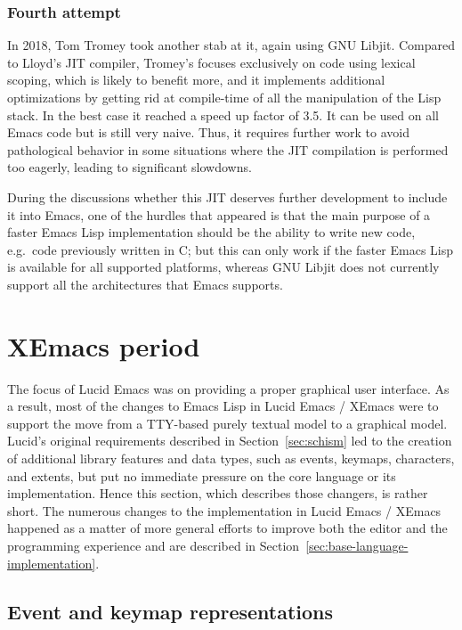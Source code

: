 \documentclass[format=acmsmall, review]{acmart}
\newcommand \Elisp {Emacs Lisp}
\begin{document}
\subsubsection{Fourth attempt}
In 2018, Tom Tromey took another stab at it, again using GNU Libjit.
Compared to Lloyd's JIT compiler, Tromey's focuses exclusively on code using lexical scoping,
which is likely to benefit more, and it implements additional optimizations
by getting rid at compile-time of all the manipulation of the Lisp stack.
In the best case it reached a speed up factor of 3.5.
It can be used on all Emacs code but is still
very naive.  Thus, it requires further work to avoid
pathological behavior in some situations where the JIT compilation is
performed too eagerly, leading to significant slowdowns.

During the discussions whether this JIT deserves further development to
include it into Emacs, one of the hurdles that appeared is that the main
purpose of a faster \Elisp{} implementation should be the ability to write
new code, e.g.\ code previously written in C; but this can only work if the
faster \Elisp{} is available for all supported platforms, whereas GNU
Libjit does not currently support all the architectures that Emacs supports.


\section{XEmacs period}         %
\label{sec:xemacs}

The focus of Lucid Emacs was on providing a proper graphical user
interface.  As a result, most of the changes to \Elisp{} in Lucid
Emacs / XEmacs were to support the move from a TTY-based purely
textual model to a graphical model.  Lucid's original requirements
described in Section~\ref{sec:schism} led to the creation of
additional library features and data types, such as events, keymaps,
characters, and extents, but put no immediate pressure on the core
language or its implementation.  Hence this section, which describes
those changers, is rather short.  The numerous changes to the
implementation in Lucid Emacs / XEmacs happened as a matter of more
general efforts to improve both the editor and the programming
experience and are described in
Section~\ref{sec:base-language-implementation}.

\subsection{Event and keymap representations}
\label{sec:keymaps}
\end{document}
